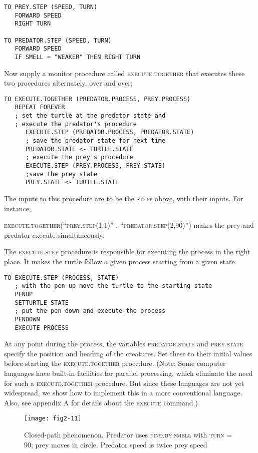 \documentclass{book}
\begin{document}
\begin{verbatim}
TO PREY.STEP (SPEED, TURN)
   FORWARD SPEED
   RIGHT TURN

TO PREDATOR.STEP (SPEED, TURN)
   FORWARD SPEED
   IF SMELL = "WEAKER" THEN RIGHT TURN
\end{verbatim}
Now supply a monitor procedure called \textsc{execute.together} that executes these two procedures alternately, over and over;

\begin{verbatim}
TO EXECUTE.TOGETHER (PREDATOR.PROCESS, PREY.PROCESS)
   REPEAT FOREVER
   ; set the turtle at the predator state and
   ; execute the predator's procedure
      EXECUTE.STEP (PREDATOR.PROCESS, PREDATOR.STATE)
      ; save the predator state for next time
      PREDATOR.STATE <- TURTLE.STATE
      ; execute the prey's procedure
      EXECUTE.STEP (PREY.PROCESS, PREY.STATE)
      ;save the prey state
      PREY.STATE <- TURTLE.STATE
\end{verbatim}
The inputs to this procedure are to be the \textsc{step}s above, with their inputs.
For instance,

\textsc{execute.together(``prey.step(1,1)'' . ``predator.step(2,90)'')} 
makes the prey and predator execute simultaneously.

The \textsc{execute.step} procedure is responsible for executing the process
in the right place. It makes the turtle follow a given process starting
from a given state.

\begin{verbatim}
TO EXECUTE.STEP (PROCESS, STATE)
   ; with the pen up move the turtle to the starting state
   PENUP
   SETTURTLE STATE
   ; put the pen down and execute the process
   PENDOWN
   EXECUTE PROCESS
\end{verbatim}
At any point during the process, the variables \textsc{predator.state} and
\textsc{prey.state} specify the position and heading of the creatures. Set
these to their initial values before starting the \textsc{execute.together} procedure. (Note: Some computer languages have built-in facilities for parallel
processing, which eliminate the need for such a \textsc{execute.together} procedure. But since these languages are not yet widespread, we show how
to implement this in a more conventional language. Also, see appendix
A for details about the \textsc{execute} command.)

\begin{figure}
\begin{center}
\texttt{[image: fig2-11]}
\caption{Closed-path phenomenon. Predator uses \textsc{find}\textsc{.by}\textsc{.smell} with \textsc{turn} = 90; prey moves in circle. Predator speed is twice prey speed}
\end{center}
\end{figure}
\end{document}
